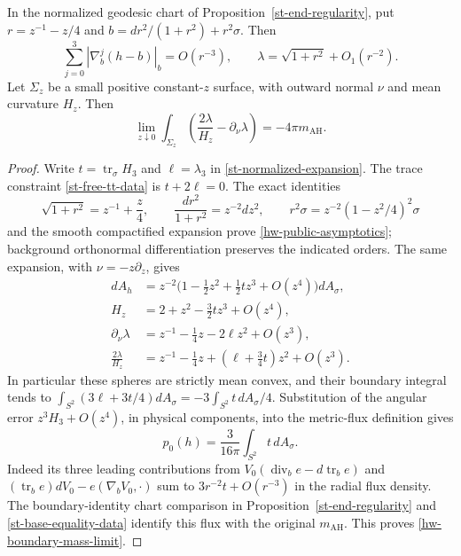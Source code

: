 \begin{lemma}
\label{hw-normalized-end}
In the normalized geodesic chart of
Proposition~\ref{st-end-regularity}, put $r=z^{-1}-z/4$ and
$b=dr^2/(1+r^2)+r^2\sigma$.  Then
\begin{equation}\label{hw-public-asymptotics}
 \sum_{j=0}^3|\nabla_b^j(h-b)|_b=O(r^{-3}),\qquad
 \lambda=\sqrt{1+r^2}+O_1(r^{-2}).
\end{equation}
Let $\Sigma_z$ be a small positive constant-$z$ surface, with
outward normal $\nu$ and mean curvature $H_z$.  Then
\begin{equation}\label{hw-boundary-mass-limit}
 \lim_{z\downarrow0}\int_{\Sigma_z}
       \left(\frac{2\lambda}{H_z}-\partial_\nu\lambda\right)
       =-4\pi m_{\mathrm{AH}}.
\end{equation}
\end{lemma}

\begin{proof}
Write $t=\operatorname{tr}_\sigma H_3$ and $\ell=\lambda_3$ in
\eqref{st-normalized-expansion}.  The trace constraint
\eqref{st-free-tt-data} is $t+2\ell=0$.
The exact identities
\[
 \sqrt{1+r^2}=z^{-1}+\frac z4,\qquad
 \frac{dr^2}{1+r^2}=z^{-2}dz^2,\qquad
 r^2\sigma=z^{-2}(1-z^2/4)^2\sigma
\]
and the smooth compactified expansion prove
\eqref{hw-public-asymptotics}; background orthonormal
differentiation preserves the indicated orders.
The same expansion, with $\nu=-z\partial_z$, gives
\begin{align*}
 dA_h&=z^{-2}\bigl(1-\tfrac12z^2+\tfrac12t z^3+O(z^4)\bigr)dA_\sigma,\\
 H_z&=2+z^2-\tfrac32t z^3+O(z^4),\\
 \partial_\nu\lambda&=z^{-1}-\tfrac14z-2\ell z^2+O(z^3),\\
 \frac{2\lambda}{H_z}
       &=z^{-1}-\tfrac14z+(\ell+\tfrac34t)z^2+O(z^3).
\end{align*}
In particular these spheres are strictly mean convex, and their
boundary integral tends to
$\int_{S^2}(3\ell+3t/4)dA_\sigma=-3\int_{S^2}t\,dA_\sigma/4$.
Substitution of the angular error $z^3H_3+O(z^4)$, in physical
components, into the metric-flux definition gives
\[
 p_0(h)=\frac{3}{16\pi}\int_{S^2}t\,dA_\sigma.
\]
Indeed its three leading contributions from
$V_0(\operatorname{div}_b e-d\operatorname{tr}_b e)$ and
$(\operatorname{tr}_b e)dV_0-e(\nabla_bV_0,\cdot)$ sum to
$3r^{-2}t+O(r^{-3})$ in the radial flux density.
The boundary-identity chart comparison in
Proposition~\ref{st-end-regularity} and
\eqref{st-base-equality-data} identify this flux with the original
$m_{\mathrm{AH}}$.  This proves \eqref{hw-boundary-mass-limit}.
\end{proof}

